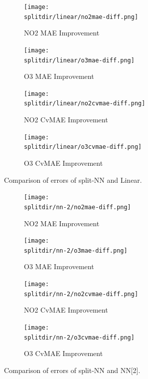 \documentclass[journal abbreviation, manuscript]{copernicus}
\begin{document}
\begin{figure}[H]
\begin{subfigure}{0.49\textwidth}
\texttt{[image: \\splitdir/linear/no2mae-diff.png]}
\caption{NO2 MAE Improvement}
\end{subfigure}
\begin{subfigure}{0.49\textwidth}
\texttt{[image: \\splitdir/linear/o3mae-diff.png]}
\caption{O3 MAE Improvement}
\end{subfigure}
\begin{subfigure}{0.49\textwidth}
\texttt{[image: \\splitdir/linear/no2cvmae-diff.png]}
\caption{NO2 CvMAE Improvement}
\end{subfigure}
\begin{subfigure}{0.49\textwidth}
\texttt{[image: \\splitdir/linear/o3cvmae-diff.png]}
\caption{O3 CvMAE Improvement}
\end{subfigure}
\caption{Comparison of errors of split-NN and Linear.}
\end{figure}

\begin{figure}[H]
\begin{subfigure}{0.49\textwidth}
\texttt{[image: \\splitdir/nn-2/no2mae-diff.png]}
\caption{NO2 MAE Improvement}
\end{subfigure}
\begin{subfigure}{0.49\textwidth}
\texttt{[image: \\splitdir/nn-2/o3mae-diff.png]}
\caption{O3 MAE Improvement}
\end{subfigure}
\begin{subfigure}{0.49\textwidth}
\texttt{[image: \\splitdir/nn-2/no2cvmae-diff.png]}
\caption{NO2 CvMAE Improvement}
\end{subfigure}
\begin{subfigure}{0.49\textwidth}
\texttt{[image: \\splitdir/nn-2/o3cvmae-diff.png]}
\caption{O3 CvMAE Improvement}
\end{subfigure}
\caption{Comparison of errors of split-NN and NN[2].}
\end{figure}
\end{document}
